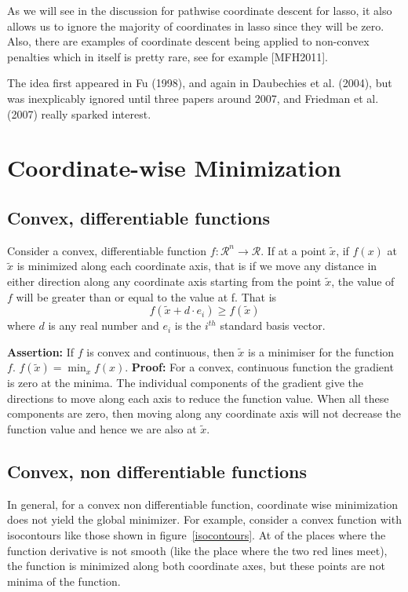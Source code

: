 \documentclass[twoside]{article}
\renewcommand{\cite}[1]{[#1]}
\begin{document}
As we will see in the discussion for pathwise coordinate descent for lasso, it also allows us to ignore the majority of coordinates in lasso since they will be zero. Also, there are examples of coordinate descent being applied to non-convex penalties which in itself is pretty rare, see for example \cite{MFH2011}.

The idea first appeared in Fu (1998), and again in Daubechies et al. (2004), but was inexplicably ignored until three papers around 2007, and Friedman et al. (2007) really sparked interest.

\section{Coordinate-wise Minimization}

\subsection{Convex, differentiable functions}
Consider a convex, differentiable function $f:\mathcal{R}^n \rightarrow \mathcal{R}$. If at a point $\tilde{x}$, if $f(x)$ at $\tilde{x}$ is minimized along each coordinate axis, that is if we move any distance in either direction along any coordinate axis starting from the point $\tilde{x}$, the value of $f$ will be greater than or equal to the value at f. That is $$f(\tilde{x}+d\cdot e_i) \geq f(\tilde{x})$$ where $d$ is any real number and $e_i$ is the $i^{th}$ standard basis vector. 

\textbf{Assertion:} If $f$ is convex and continuous, then $\tilde{x}$ is a minimiser for the function $f$. $f(\tilde{x}) = \min_x f(x)$.
\textbf{Proof:} For a convex, continuous function the gradient is zero at the minima. The individual components of the gradient give the directions to move along each axis to reduce the function value. When all these components are zero, then moving along any coordinate axis will not decrease the function value and hence we are also at $\tilde{x}$.

\subsection{Convex, non differentiable functions}

In general, for a convex non differentiable function, coordinate wise minimization does not yield the global minimizer. For example, consider a convex function with isocontours like those shown in figure~\ref{isocontours}. At of the places where the function derivative is not smooth (like the place where the two red lines meet), the function is minimized along both coordinate axes, but these points are not minima of the function.
\end{document}
